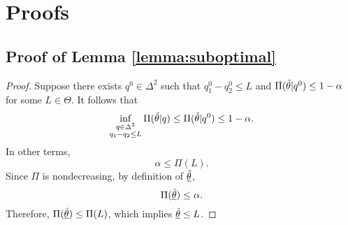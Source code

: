 \section{Proofs}\label{sec:proofs}

\subsection{Proof of Lemma \ref{lemma:suboptimal}}\label{subsec:proof-of-lemma-ref{lemma:suboptimal}}
\begin{proof}
    Suppose there exists $q^0\in\Delta^{2}$ such that $q^0_1-q^0_2\leq L$ and $\Pi(\Tilde{\theta}|q^0)\leq 1-\alpha$ for some $L\in\Theta$.
    It follows that
    \[
        \inf_{\substack{q\in\Delta^{2}\\q_1-q_2\leq L}}\Pi(\Tilde{\theta}|q)\leq\Pi(\Tilde{\theta}|q^0)\leq 1-\alpha.
    \]
    In other terms,
    \[\alpha\leq\Pi(L).\]
    Since $\Pi$ is nondecreasing, by definition of $\underline{\Hat{\theta}}$,
    \[\Pi(\underline{\Hat{\theta}})\leq\alpha.\]
    Therefore, $\Pi(\underline{\Hat{\theta}})\leq\Pi(L)$, which implies $\underline{\Hat{\theta}}\leq L$.
\end{proof}

